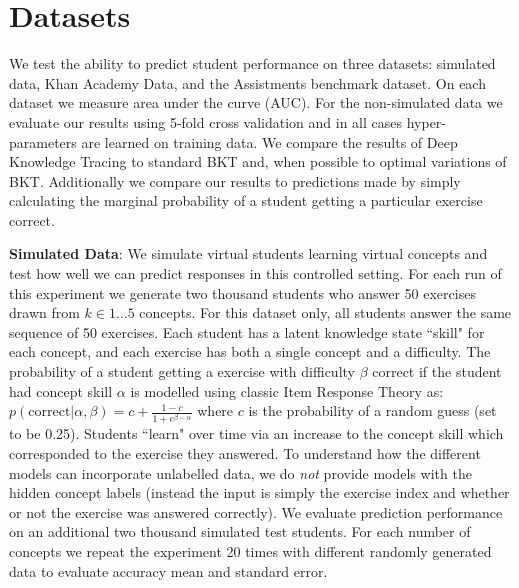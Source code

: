 \section{Datasets}

We test the ability to predict student performance on three datasets: simulated data, Khan Academy Data, and the Assistments benchmark dataset. On each dataset we measure area under the curve (AUC). For the non-simulated data we evaluate our results using 5-fold cross validation and in all cases hyper-parameters are learned on training data. We compare the results of Deep Knowledge Tracing to standard BKT and, when possible to optimal variations of BKT. Additionally we compare our results to predictions made by simply calculating the marginal probability of a student getting a particular exercise correct.

\textbf{Simulated Data}: We simulate virtual students learning virtual concepts and test how well we can predict responses in this controlled setting. 
For each run of this experiment we generate two thousand students who answer 50 exercises drawn from $k \in {1 \dots 5}$ concepts. 
For this dataset only, all students answer the same sequence of 50 exercises. 
Each student has a latent knowledge state ``skill" for each concept, and each exercise has both a single concept and a difficulty.
The probability of a student getting a exercise with difficulty $\beta$ correct if the student had concept skill $\alpha$ is modelled using classic Item Response Theory \cite{drasgow1990item} as:
       $p(\text{correct} | \alpha, \beta) = c + \frac{1 - c}{1 + e^{\beta -\alpha}}$
where $c$ is the probability of a random guess (set to be 0.25). Students ``learn" over time via an increase to the concept skill which corresponded to the exercise they answered. To understand how the different models can incorporate unlabelled data, we do \emph{not} provide models with the hidden concept labels (instead the input is simply the exercise index and whether or not the exercise was answered correctly). We evaluate prediction performance on an additional two thousand simulated test students. For each number of concepts we repeat the experiment 20 times with different randomly generated data to evaluate accuracy mean and standard error.

